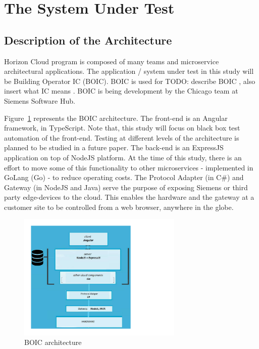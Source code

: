 \documentclass[conference]{IEEEtran}
\newcommand{\todo}[1]{}
\renewcommand{\todo}[1]{{\color{red} TODO: {#1}}}
\begin{document}
\section{The System Under Test}

	\subsection{Description of the Architecture}
	
	Horizon Cloud program is composed of many teams and microservice architectural applications.
	The application / system under test in this study will be Building Operator IC (BOIC).
	BOIC is used for \todo {describe BOIC , also insert what IC means} . BOIC is being development by the Chicago team at Siemens Software Hub. 

	Figure~\ref{fig:BOIC architecture} represents the BOIC architecture.
	The front-end is an Angular framework, in TypeScript.
	Note that, this study will focus on black box test automation of the front-end. Testing at different levels of the architecture is planned to be studied in a future paper. 
	The back-end is an ExpressJS application on top of NodeJS platform. 
	At the time of this study, there is an effort to move some of this functionality to other microservices - implemented in GoLang (Go) - to reduce operating costs.
	The Protocol Adapter (in C\#) and Gateway (in NodeJS and Java) serve the purpose of exposing Siemens or third party edge-devices to the cloud. 
	This enables the hardware and the gateway at a customer site to be controlled from a web browser, anywhere in the globe.

\begin{figure}[!h]
		\includegraphics[width=0.70\textwidth,]{architecture.pdf}
	\caption{BOIC architecture}
	\label{fig:BOIC architecture}
\end{figure}
\end{document}
